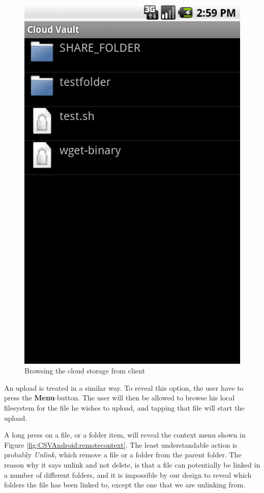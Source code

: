 \documentclass[pdftex,english,10pt,b5paper,twoside]{book}
\begin{document}
\begin{figure}[h!]
    \centering
    \includegraphics[scale=0.4]{client-remotebrowse.png}
    \caption{Browsing the cloud storage from client}
    \label{fig:CSVAndroid:remotebrowse}
\end{figure}

An upload is treated in a similar way. To reveal this option, the user have to
press the \textbf{Menu}-button. The user will then be allowed to browse his
local filesystem for the file he wishes to upload, and tapping that file will
start the upload.

A long press on a file, or a folder item, will reveal the context menu shown in
Figure \ref{fig:CSVAndroid:remotecontext}. The least understandable action is
probably \emph{Unlink}, which remove a file or a folder from the parent folder.
The reason why it says unlink and not delete, is that a file can potentially be
linked in a number of different folders, and it is impossible by our design to
reveal which folders the file has been linked to, except the one that we are
unlinking from.
\end{document}
